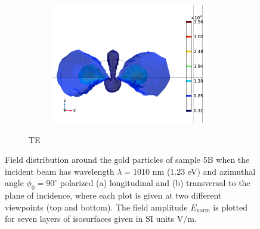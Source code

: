 \begin{figure}
\begin{subfigure}{0.5\textwidth}
    \begin{subfigure}{\textwidth}
        \centering
        \includegraphics[width=0.9\linewidth]{figures/ch4/S5B/fielddistr/s5b_normE_TE_wl1010_phi90(1).png}
    \end{subfigure}
    \caption{TE}
    \end{subfigure}
    \caption{Field distribution around the gold particles of sample 5B when the incident beam has wavelength $\lambda=1010$ nm ($1.23$ eV) and azimuthal angle $\phi_0=90^\circ$ polarized (a) longitudinal and (b) transversal to the plane of incidence, where each plot is given at two different viewpoints (top and bottom). The field amplitude $E_\text{norm}$ is plotted for seven layers of isosurfaces given in SI units V$/$m.}
    \label{fig:S5B_fielddstribution_LSPR_phi90}
\end{figure}

